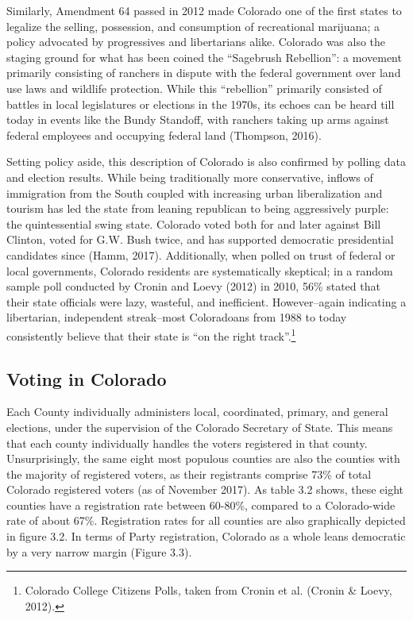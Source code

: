 \documentclass[12pt,twoside]{reedthesis}
\begin{document}
  Similarly, Amendment 64 passed in 2012 made Colorado one of the first
  states to legalize the selling, possession, and consumption of
  recreational marijuana; a policy advocated by progressives and
  libertarians alike. Colorado was also the staging ground for what has
  been coined the ``Sagebrush Rebellion'': a movement primarily consisting
  of ranchers in dispute with the federal government over land use laws
  and wildlife protection. While this ``rebellion'' primarily consisted of
  battles in local legislatures or elections in the 1970s, its echoes can
  be heard till today in events like the Bundy Standoff, with ranchers
  taking up arms against federal employees and occupying federal land
  (Thompson, 2016).
  
  Setting policy aside, this description of Colorado is also confirmed by
  polling data and election results. While being traditionally more
  conservative, inflows of immigration from the South coupled with
  increasing urban liberalization and tourism has led the state from
  leaning republican to being aggressively purple: the quintessential
  swing state. Colorado voted both for and later against Bill Clinton,
  voted for G.W. Bush twice, and has supported democratic presidential
  candidates since (Hamm, 2017). Additionally, when polled on trust of
  federal or local governments, Colorado residents are systematically
  skeptical; in a random sample poll conducted by Cronin and Loevy (2012)
  in 2010, 56\% stated that their state officials were lazy, wasteful, and
  inefficient. However--again indicating a libertarian, independent
  streak--most Coloradoans from 1988 to today consistently believe that
  their state is ``on the right track''.\footnote{Colorado College
    Citizens Polls, taken from Cronin et al. (Cronin \& Loevy, 2012).}
  
  \subsection{Voting in Colorado}\label{voting-in-colorado}
  
  Each County individually administers local, coordinated, primary, and
  general elections, under the supervision of the Colorado Secretary of
  State. This means that each county individually handles the voters
  registered in that county. Unsurprisingly, the same eight most populous
  counties are also the counties with the majority of registered voters,
  as their registrants comprise 73\% of total Colorado registered voters
  (as of November 2017). As table 3.2 shows, these eight counties have a
  registration rate between 60-80\%, compared to a Colorado-wide rate of
  about 67\%. Registration rates for all counties are also graphically
  depicted in figure 3.2. In terms of Party registration, Colorado as a
  whole leans democratic by a very narrow margin (Figure 3.3).
  
\end{document}
